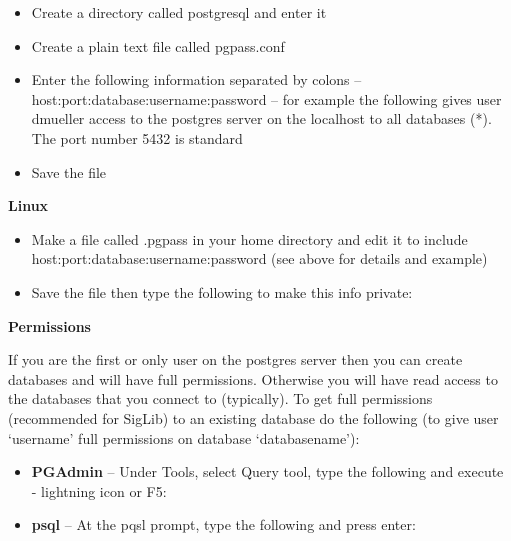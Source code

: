 \documentclass[letterpaper,10pt,openany,oneside]{sphinxmanual}
\begin{document}
\begin{itemize}
\item {} 
Create a directory called postgresql and enter it

\end{itemize}

\begin{DUlineblock}{0em}
\item[] 
\item[] 
\end{DUlineblock}
\begin{itemize}
\item {} 
Create a plain text file called pgpass.conf

\end{itemize}

\begin{itemize}
\item {} 
Enter the following information separated by colons
--host:port:database:username:password -- for example the following
gives user dmueller access to the postgres server on the localhost to
all databases (*). The port number 5432 is standard

\end{itemize}

\begin{itemize}
\item {} 
Save the file

\end{itemize}

\textbf{Linux}
\begin{itemize}
\item {} 
Make a file called .pgpass in your home directory and edit it to
include host:port:database:username:password (see above for details
and example)

\item {} 
Save the file then type the following to make this info private:

\end{itemize}


\textbf{Permissions}

If you are the first or only user on the postgres server then you can
create databases and will have full permissions. Otherwise you will have
read access to the databases that you connect to (typically). To get
full permissions (recommended for SigLib) to an existing database do the
following (to give user `username' full permissions on database
`databasename'):
\begin{itemize}
\item {} 
\textbf{PGAdmin} -- Under Tools, select Query tool, type the following and
execute - lightning icon or F5:

\item {} 
\textbf{psql} -- At the pqsl prompt, type the following and press enter:

\end{itemize}
\end{document}
